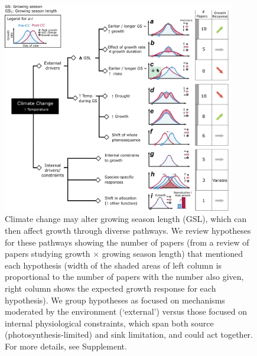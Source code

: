 \documentclass[11pt]{article}
\begin{document}
\begin{figure}[h!]
\includegraphics[width=0.9\textwidth]{..//figures/_figuresFromRuben/conceptualRev.png}
\caption{Climate change may alter growing season length (GSL), which can then affect growth through diverse pathways. We review hypotheses for these pathways showing the number of papers (from a review of papers studying growth $\times$ growing season length) that mentioned each hypothesis (width of the shaded areas of left column is proportional to the number of papers with the number also given, right column shows the expected growth response for each hypothesis). We group hypotheses as focused on mechanisms moderated by the environment (`external') versus those focused on internal physiological constraints, which span both source (photosynthesis-limited) and sink limitation, and could act together. For more details, see Supplement.} 
\label{fig:hypotheses}
\end{figure}
\end{document}
